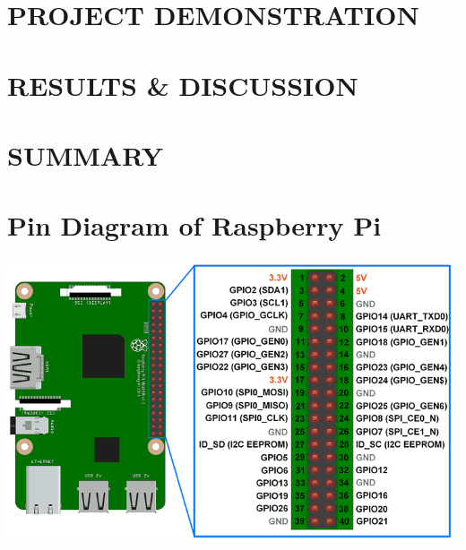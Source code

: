 \documentclass[a4paper,12pt,bibliography=totocnumbered]{report}
\begin{document}
	\chapter{PROJECT DEMONSTRATION}
	\Blindtext
	\chapter{RESULTS \& DISCUSSION} \label{res}
	\Blindtext
	\chapter{SUMMARY}
	\Blindtext
	\clearpage
	
	
	
	\appendices
	\appendixname
	
	
	
	
	
	
	
	
	
	\chapter{Pin Diagram of Raspberry Pi}
	\includegraphics[width=\linewidth]{raspberry_pin_diag}
	
	
	
	
\end{document}
